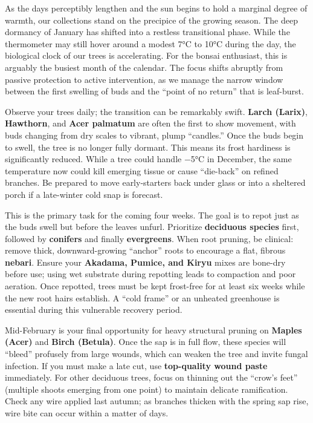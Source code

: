\label{2026-02-care}
\vfill

\noindent
As the days perceptibly lengthen and the sun begins to hold a marginal degree of warmth, our collections stand on the precipice of the growing season.
The deep dormancy of January has shifted into a restless transitional phase.
While the thermometer may still hover around a modest 7°C to 10°C during the day, the biological clock of our trees is accelerating.
For the bonsai enthusiast, this is arguably the busiest month of the calendar.
The focus shifts abruptly from passive protection to active intervention, as we manage the narrow window between the first swelling of buds and the ``point of no return'' that is leaf\--burst.

\medskip
{}
\noindent
Observe your trees daily; the transition can be remarkably swift.
\textbf{Larch (Larix)}, \textbf{Hawthorn}, and \textbf{Acer palmatum} are often the first to show movement, with buds changing from dry scales to vibrant, plump ``candles.''
Once the buds begin to swell, the tree is no longer fully dormant.
This means its frost hardiness is significantly reduced.
While a tree could handle −5°C in December, the same temperature now could kill emerging tissue or cause ``die-back'' on refined branches.
Be prepared to move early-starters back under glass or into a sheltered porch if a late-winter cold snap is forecast.

\medskip
{}
\noindent
This is the primary task for the coming four weeks.
The goal is to repot just as the buds swell but before the leaves unfurl.
Prioritize \textbf{deciduous species} first, followed by \textbf{conifers} and finally \textbf{evergreens}.
When root pruning, be clinical: remove thick, downward-growing ``anchor'' roots to encourage a flat, fibrous \textbf{nebari}.
Ensure your \textbf{Akadama, Pumice, and Kiryu} mixes are bone\--dry before use; using wet substrate during repotting leads to compaction and poor aeration.
Once repotted, trees must be kept frost\--free for at least six weeks while the new root hairs establish.
A ``cold frame'' or an unheated greenhouse is essential during this vulnerable recovery period.

\medskip
{}
\noindent
Mid\--February is your final opportunity for heavy structural pruning on \textbf{Maples (Acer)} and \textbf{Birch (Betula)}.
Once the sap is in full flow, these species will ``bleed'' profusely from large wounds, which can weaken the tree and invite fungal infection.
If you must make a late cut, use \textbf{top\--quality wound paste} immediately.
For other deciduous trees, focus on thinning out the ``crow's feet'' (multiple shoots emerging from one point) to maintain delicate ramification.
Check any wire applied last autumn; as branches thicken with the spring sap rise, wire bite can occur within a matter of days.

